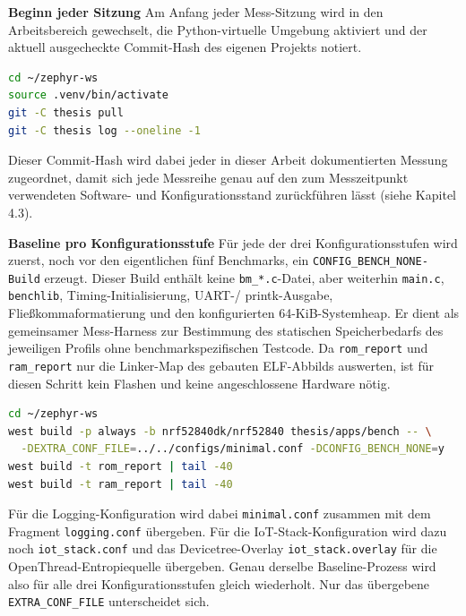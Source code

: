 \textbf{Beginn jeder Sitzung }Am Anfang jeder Mess-Sitzung wird in den Arbeitsbereich gewechselt, die Python-virtuelle Umgebung aktiviert und der aktuell ausgecheckte Commit-Hash des eigenen Projekts notiert.

\begin{lstlisting}[style=basecode,language=BAsh]
cd ~/zephyr-ws
source .venv/bin/activate
git -C thesis pull
git -C thesis log --oneline -1
\end{lstlisting}
Dieser Commit-Hash wird dabei jeder in dieser Arbeit dokumentierten Messung zugeordnet, damit sich jede Messreihe genau auf den zum Messzeitpunkt verwendeten Software- und Konfigurationsstand zur{\"u}ckf{\"u}hren l{\"a}sst (siehe Kapitel 4.3).

\textbf{Baseline pro Konfigurationsstufe }F{\"u}r jede der drei Konfigurationsstufen wird zuerst, noch vor den eigentlichen f{\"u}nf Benchmarks, ein \lstinline[style=fileinline]|CONFIG_BENCH_NONE-Build| erzeugt. Dieser Build enth{\"a}lt keine \lstinline[style=fileinline]|bm_*.c|-Datei, aber weiterhin \lstinline[style=fileinline]|main.c|, \lstinline[style=fileinline]|benchlib|, Timing-Initialisierung, UART-/ printk-Ausgabe, Flie{\ss}kommaformatierung und den konfigurierten 64-KiB-Systemheap. Er dient als gemeinsamer Mess-Harness zur Bestimmung des statischen Speicherbedarfs des jeweiligen Profils ohne benchmarkspezifischen Testcode. Da \lstinline[style=fileinline]|rom_report| und \lstinline[style=fileinline]|ram_report| nur die Linker-Map des gebauten ELF-Abbilds auswerten, ist f{\"u}r diesen Schritt kein Flashen und keine angeschlossene Hardware n{\"o}tig.

\begin{lstlisting}[style=basecode,language=BAsh]
cd ~/zephyr-ws
west build -p always -b nrf52840dk/nrf52840 thesis/apps/bench -- \
  -DEXTRA_CONF_FILE=../../configs/minimal.conf -DCONFIG_BENCH_NONE=y
west build -t rom_report | tail -40
west build -t ram_report | tail -40
\end{lstlisting}
F{\"u}r die Logging-Konfiguration wird dabei \lstinline[style=fileinline]|minimal.conf| zusammen mit dem Fragment \lstinline[style=fileinline]|logging.conf| {\"u}bergeben. F{\"u}r die IoT-Stack-Konfiguration wird dazu noch \lstinline[style=fileinline]|iot_stack.conf| und das Devicetree-Overlay \lstinline[style=fileinline]|iot_stack.overlay| f{\"u}r die OpenThread-Entropiequelle {\"u}bergeben. Genau derselbe Baseline-Prozess wird also f{\"u}r alle drei Konfigurationsstufen gleich wiederholt. Nur das {\"u}bergebene \lstinline[style=fileinline]|EXTRA_CONF_FILE| unterscheidet sich.

